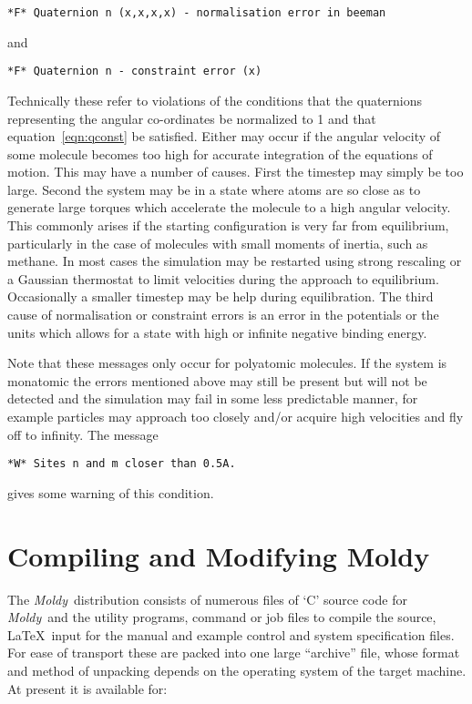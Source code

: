 \documentclass[twoside]{report}
\newcommand{\moldy}{{\em Moldy}}
\begin{document}
\texttt{*F* Quaternion n (x,x,x,x) - normalisation error in beeman}

and

\texttt{*F* Quaternion n - constraint error (x)}

\noindent
Technically these refer to violations of the conditions that the
quaternions representing the angular co-ordinates be normalized to 1
and that equation~\ref{eqn:qconst} be satisfied.  Either may occur if
the angular velocity of some molecule becomes too high for accurate
integration of the equations of motion. This may have a number of
causes.  First the timestep may simply be too large.  Second the
system may be in a state where atoms are so close as to generate large
torques which accelerate the molecule to a high angular velocity. This
commonly arises if the starting configuration is very far from
equilibrium, particularly in the case of molecules with small moments
of inertia, such as methane.  In most cases the simulation may be
restarted using strong rescaling or a Gaussian thermostat to limit
velocities during the approach to equilibrium.  Occasionally a smaller
timestep may be help during equilibration.  The third cause of
normalisation or constraint errors is an error in the potentials or
the units which allows for a state with high or infinite negative
binding energy.

Note that these messages only occur for polyatomic molecules.  If the
system is monatomic the errors mentioned above may still be present
but will not be detected and the simulation may fail in some less
predictable manner, for example particles may approach too closely
and/or acquire high velocities and fly off to infinity.  The message

\texttt{*W* Sites n and m closer than 0.5A.}

\noindent
gives some warning of this condition.

\chapter{Compiling and Modifying Moldy} %

The \moldy\  distribution consists of numerous files of `C' source code
for \moldy\  and the utility programs, command or job files to compile
the source, \LaTeX\ input for the manual and example control and system
specification files.  For ease of transport these are packed into one
large ``archive'' file, whose format and method of unpacking depends
on the operating system of the target machine.  At present it is
available for:
\end{document}

